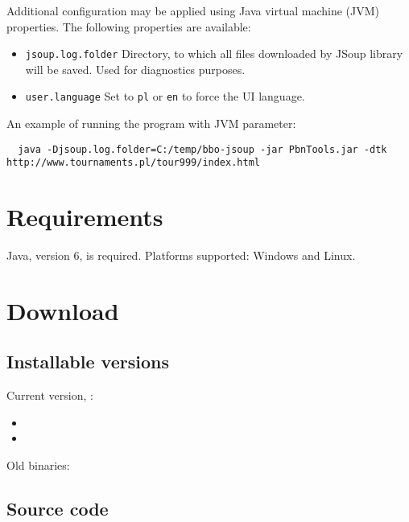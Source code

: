 \documentclass[polish,a4paper,11pt,oneside]{article}
\begin{document}
Additional configuration may be applied using
Java virtual machine (JVM) properties.
The following properties are available:

\begin{itemize}
\item \verb!jsoup.log.folder! Directory, to which all files
  downloaded by JSoup library will be saved.
  Used for diagnostics purposes.
\item \verb!user.language! Set to \verb!pl! or \verb!en! to force the UI language.
\end{itemize}

An example of running the program with JVM parameter:

\begin{verbatim}
  java -Djsoup.log.folder=C:/temp/bbo-jsoup -jar PbnTools.jar -dtk http://www.tournaments.pl/tour999/index.html
\end{verbatim}



\section{Requirements}

Java, version 6, is required. Platforms supported: Windows and Linux.

\section{Download} \label{download}

\subsection{Installable versions} \label{downloadBin}

Current version, \version{}:

\begin{itemize}
\item
\item

\end{itemize}

Old binaries:
\oldBinaries

\subsection{Source code} \label{downloadSrc}
\end{document}
